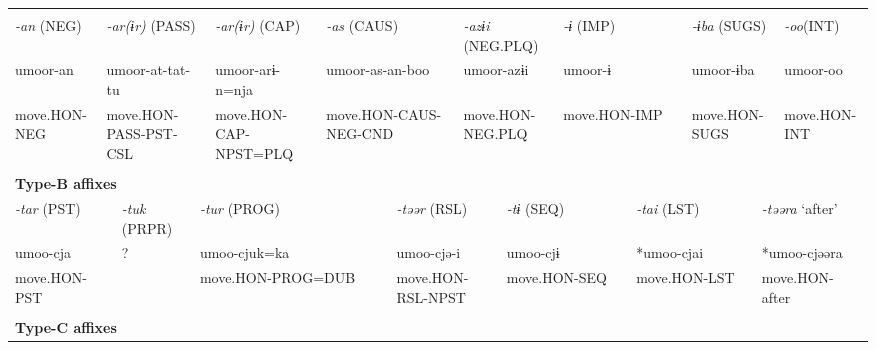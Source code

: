 \tabletail{}
\tablelasttail{}
\begin{tabularx}{\textwidth}{XXXXXXXXXXXXXXXXXXXX}
\lsptoprule
\multicolumn{20}{X}{{\bfseries Type-A affixes}}\\
\multicolumn{2}{X}{{ \textit{{}-an} (NEG)}} & \multicolumn{5}{X}{{ \textit{{}-ar(ɨr)} (PASS)}} & \multicolumn{2}{X}{{ \textit{{}-ar(ɨr)} (CAP)}} & \multicolumn{3}{X}{{ \textit{{}-as} (CAUS)}} & \multicolumn{3}{X}{{ \textit{{}-azɨi} (NEG.PLQ)}} & \multicolumn{2}{X}{{ \textit{{}-ɨ} (IMP)}} & \multicolumn{2}{X}{{ \textit{{}-ɨba} (SUGS)}} & { \textit{{}-oo}(INT)}\\
\multicolumn{2}{X}{{ umoor-an}} & \multicolumn{5}{X}{{ umoor-at-tat-tu}} & \multicolumn{2}{X}{{ umoor-arɨ-n=nja}} & \multicolumn{3}{X}{{ umoor-as-an-boo}} & \multicolumn{3}{X}{{ umoor-azɨi}} & \multicolumn{2}{X}{{ umoor-ɨ}} & \multicolumn{2}{X}{{ umoor-ɨba}} & { umoor-oo}\\
\multicolumn{2}{X}{move.HON-NEG} & \multicolumn{5}{X}{move.HON-PASS-PST-CSL} & \multicolumn{2}{X}{move.HON-CAP-NPST=PLQ} & \multicolumn{3}{X}{move.HON-CAUS-NEG-CND} & \multicolumn{3}{X}{move.HON-NEG.PLQ} & \multicolumn{2}{X}{move.HON-IMP} & \multicolumn{2}{X}{move.HON-SUGS} & move.HON-INT\\
\multicolumn{20}{X}{}\\
\multicolumn{20}{X}{{\bfseries Type-B affixes}}\\
\multicolumn{3}{X}{{ \textit{{}-tar} (PST)}} & \multicolumn{3}{X}{{ \textit{{}-tuk} (PRPR)}} & \multicolumn{5}{X}{{ \textit{{}-tur} (PROG)}} & \multicolumn{3}{X}{{ \textit{{}-təər} (RSL)}} & \multicolumn{2}{X}{{ \textit{{}-tɨ} (SEQ)}} & \multicolumn{2}{X}{{ \textit{{}-tai} (LST)}} & \multicolumn{2}{X}{{ \textit{{}-təəra} ‘after’}}\\
\multicolumn{3}{X}{{ umoo-cja}} & \multicolumn{3}{X}{{ ?}} & \multicolumn{5}{X}{{ umoo-cjuk=ka}} & \multicolumn{3}{X}{{ umoo-cjə-i}} & \multicolumn{2}{X}{{ umoo-cjɨ}} & \multicolumn{2}{X}{{ *umoo-cjai}} & \multicolumn{2}{X}{{ *umoo-cjəəra}}\\
\multicolumn{3}{X}{move.HON-PST} & \multicolumn{3}{X}{} & \multicolumn{5}{X}{move.HON-PROG=DUB} & \multicolumn{3}{X}{move.HON-RSL-NPST} & \multicolumn{2}{X}{move.HON-SEQ} & \multicolumn{2}{X}{move.HON-LST} & \multicolumn{2}{X}{{ move.HON-after}}\\
\multicolumn{3}{X}{} & \multicolumn{3}{X}{} & \multicolumn{5}{X}{} & \multicolumn{3}{X}{} & \multicolumn{2}{X}{} & \multicolumn{2}{X}{} & \multicolumn{2}{X}{}\\
\multicolumn{20}{X}{{\bfseries Type-C affixes}}\\

\end{tabularx}
